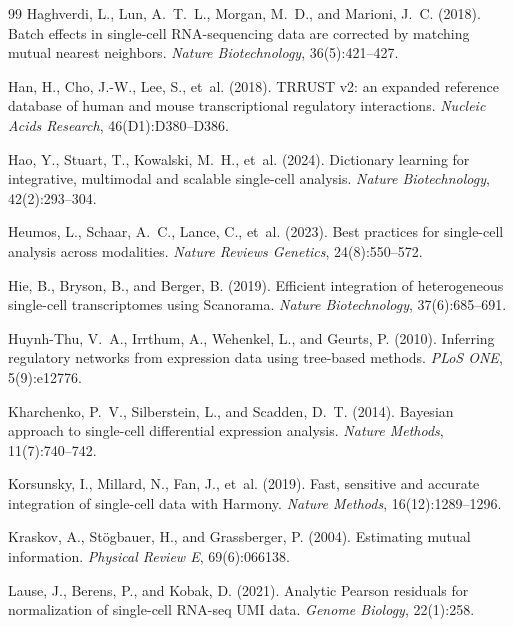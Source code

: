 \documentclass[unnumsec,webpdf,contemporary,large,namedate]{oup-authoring-template}
\begin{document}
\begin{thebibliography}{99}
Haghverdi, L., Lun, A.~T.~L., Morgan, M.~D., and Marioni, J.~C. (2018).
\newblock Batch effects in single-cell RNA-sequencing data are corrected by
  matching mutual nearest neighbors.
\newblock \textit{Nature Biotechnology}, 36(5):421--427.

Han, H., Cho, J.-W., Lee, S., et~al. (2018).
\newblock TRRUST v2: an expanded reference database of human and mouse
  transcriptional regulatory interactions.
\newblock \textit{Nucleic Acids Research}, 46(D1):D380--D386.

Hao, Y., Stuart, T., Kowalski, M.~H., et~al. (2024).
\newblock Dictionary learning for integrative, multimodal and scalable
  single-cell analysis.
\newblock \textit{Nature Biotechnology}, 42(2):293--304.

Heumos, L., Schaar, A.~C., Lance, C., et~al. (2023).
\newblock Best practices for single-cell analysis across modalities.
\newblock \textit{Nature Reviews Genetics}, 24(8):550--572.

Hie, B., Bryson, B., and Berger, B. (2019).
\newblock Efficient integration of heterogeneous single-cell transcriptomes
  using Scanorama.
\newblock \textit{Nature Biotechnology}, 37(6):685--691.

Huynh-Thu, V.~A., Irrthum, A., Wehenkel, L., and Geurts, P. (2010).
\newblock Inferring regulatory networks from expression data using tree-based
  methods.
\newblock \textit{PLoS ONE}, 5(9):e12776.

Kharchenko, P.~V., Silberstein, L., and Scadden, D.~T. (2014).
\newblock Bayesian approach to single-cell differential expression analysis.
\newblock \textit{Nature Methods}, 11(7):740--742.

Korsunsky, I., Millard, N., Fan, J., et~al. (2019).
\newblock Fast, sensitive and accurate integration of single-cell data with
  Harmony.
\newblock \textit{Nature Methods}, 16(12):1289--1296.

Kraskov, A., St{\"o}gbauer, H., and Grassberger, P. (2004).
\newblock Estimating mutual information.
\newblock \textit{Physical Review E}, 69(6):066138.

Lause, J., Berens, P., and Kobak, D. (2021).
\newblock Analytic Pearson residuals for normalization of single-cell RNA-seq
  UMI data.
\newblock \textit{Genome Biology}, 22(1):258.


\end{thebibliography}
\end{document}
